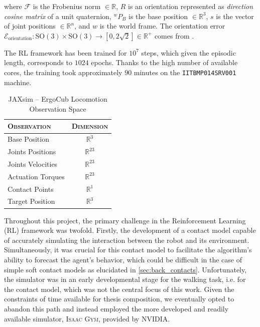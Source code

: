 where $\mathcal{F}$ is the Frobenius norm $\in \mathbb{R}$, $R$ is an orientation represented as \textit{direction cosine matrix} of a unit quaternion, ${}^wP _B$ is the base position $\in \mathbb{R} ^3$, $s$ is the vector of joint positions $\in \mathbb{R} ^{n}$, and $w$ is the world frame.
The orientation error $\mathcal{E} _{\text{orientation}} : \mathrm{SO}(3) \times \mathrm{SO}(3) \rightarrow [0, 2\sqrt{2}] \in \mathbb{R} ^+$ comes from \citep{huynh_metrics_2009}.

The \ac{RL} framework has been trained for $10^7$ steps, which given the episodic length, corresponds to $1024$ epochs. Thanks to the high number of available cores, the training took approximately $90$ minutes on the \texttt{IITBMP014SRV001} machine.

\begin{table}
    \centering
    \label{tab:walkingobs_jaxsim}
    \begin{tabular}{l c}
        \toprule
        \textsc{Observation} & \textsc{Dimension} \\
        \midrule
        Base Position        & $\mathbb{R} ^{3}$  \\
        Joints Positions     & $\mathbb{R} ^{23}$ \\
        Joints Velocities    & $\mathbb{R} ^{23}$ \\
        Actuation Torques    & $\mathbb{R} ^{23}$ \\
        Contact Points       & $\mathbb{R} ^{1}$  \\
        Target Position      & $\mathbb{R} ^{3}$  \\
        \bottomrule
    \end{tabular}
    \caption{JAXsim -- ErgoCub Locomotion Observation Space}
\end{table}

Throughout this project, the primary challenge in the Reinforcement Learning (\ac{RL}) framework was twofold. Firstly, the development of a contact model capable of accurately simulating the interaction between the robot and its environment. Simultaneously, it was crucial for this contact model to facilitate the algorithm's ability to forecast the agent's behavior, which could be difficult in the case of simple soft contact models as elucidated in \cref{sec:back_contacts}. Unfortunately, the \jaxsim simulator was in an early developmental stage for the walking task, i.e. for the contact model, which was not the central focus of this work. Given the constraints of time available for thesis composition, we eventually opted to abandon this path and instead employed the more developed and readily available simulator, \textsc{Isaac Gym}, provided by NVIDIA.

